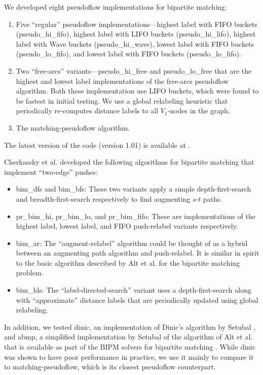 \documentclass{article}
\begin{document}
We developed eight pseudoflow implementations for bipartite matching:
\begin{enumerate}
\item Five ``regular'' pseudoflow implementations---highest label with FIFO buckets (pseudo\_hi\_fifo), highest label with LIFO buckets (pseudo\_hi\_lifo), highest label with Wave buckets (pseudo\_hi\_wave), lowest label with FIFO buckets (pseudo\_lo\_fifo), and lowest label with FIFO buckets (pseudo\_lo\_lifo).
\item Two ``free-arcs'' variants---{\sf pseudo\_hi\_free} and {\sf pseudo\_lo\_free} that are the highest and lowest label implementations of the free-arcs pseudoflow algorithm.  Both these implementation use LIFO buckets, which were found to be fastest in initial testing.  We use a global relabeling heuristic that periodically re-computes distance labels to all $V_1$-nodes in the graph.
\item The {\sf matching-pseudoflow} algorithm.
\end{enumerate}
The latest version of the code (version 1.01) is available at \cite{WebPS}.

Cherkassky et al. \cite{CheGMSS98} developed the following algorithms for bipartite matching that implement ``two-edge'' pushes:
\begin{itemize}
\item {\sf bim\_dfs} and {\sf bim\_bfs}: These two variants apply a simple depth-first-search and breadth-first-search respectively to find augmenting $s$-$t$ paths.
\item {\sf pr\_bim\_hi}, {\sf pr\_bim\_lo}, and {\sf pr\_bim\_fifo}: These are implementations of the highest label, lowest label, and FIFO push-relabel variants respectively.
\item {\sf bim\_ar}: The ``augment-relabel'' algorithm could be thought of as a hybrid between an augmenting path algorithm and push-relabel. It is similar in spirit to the basic algorithm described by Alt et al. \cite{AltBMP91} for the bipartite matching problem.
\item {\sf bim\_lds}: The ``label-directed-search'' variant uses a depth-first-search along with ``approximate'' distance labels that are periodically updated using global relabeling.
\end{itemize}

In addition, we tested {\sf dinic}, an implementation of Dinic's algorithm by Setubal \cite{Set93}, and {\sf abmp}, a simplified implementation by Setubal \cite{Set96} of the algorithm of Alt et al.\cite{AltBMP91} that is available as part of the BIPM solvers for bipartite matching \cite{BIPM}.  While {\sf dinic} was shown to have poor performance in practice, we use it mainly to compare it to {\sf matching-pseudoflow}, which is its closest pseudoflow counterpart.
\end{document}
